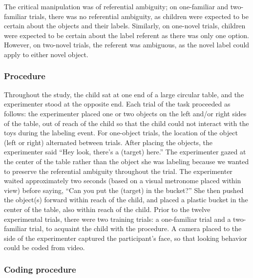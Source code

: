 \documentclass[10pt, letterpaper]{article}
\begin{document}
The critical manipulation was of referential ambiguity; on one-familiar
and two-familiar trials, there was no referential ambiguity, as children
were expected to be certain about the objects and their labels.
Similarly, on one-novel trials, children were expected to be certain
about the label referent as there was only one option. However, on
two-novel trials, the referent was ambiguous, as the novel label could
apply to either novel object.

\subsubsection{Procedure}\label{procedure}

Throughout the study, the child sat at one end of a large circular
table, and the experimenter stood at the opposite end. Each trial of the
task proceeded as follows: the experimenter placed one or two objects on
the left and/or right sides of the table, out of reach of the child so
that the child could not interact with the toys during the labeling
event. For one-object trials, the location of the object (left or right)
alternated between trials. After placing the objects, the experimenter
said ``Hey look, there's a (target) here.'' The experimenter gazed at
the center of the table rather than the object she was labeling because
we wanted to preserve the referential ambiguity throughout the trial.
The experimenter waited approximately two seconds (based on a visual
metronome placed within view) before saying, ``Can you put the (target)
in the bucket?'' She then pushed the object(s) forward within reach of
the child, and placed a plastic bucket in the center of the table, also
within reach of the child. Prior to the twelve experimental trials,
there were two training trials: a one-familiar trial and a two-familiar
trial, to acquaint the child with the procedure. A camera placed to the
side of the experimenter captured the participant's face, so that
looking behavior could be coded from video.

\subsubsection{Coding procedure}\label{coding-procedure}
\end{document}
